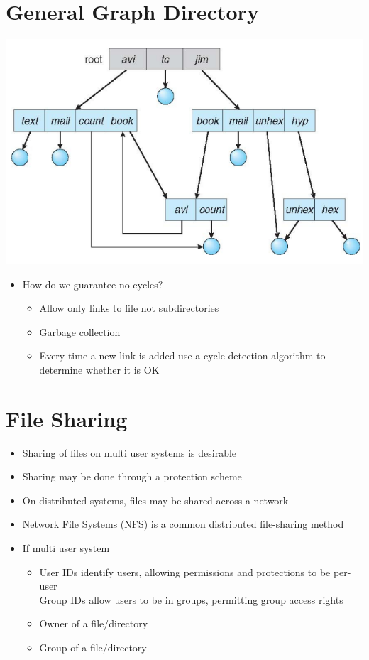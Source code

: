\documentclass{article}[18pt]
\begin{document}
\section{General Graph Directory}
\begin{center}
	\includegraphics[scale=0.7]{General}
\end{center}
\begin{itemize}
	\item How do we guarantee no cycles?
	\begin{itemize}
		\item Allow only links to file not subdirectories
		\item Garbage collection
		\item Every time a new link is added use a cycle detection algorithm to determine whether it is OK
	\end{itemize}
\end{itemize}
\section{File Sharing}
\begin{itemize}
	\item Sharing of files on multi user systems is desirable
	\item Sharing may be done through a protection scheme
	\item On distributed systems, files may be shared across a network
	\item Network File Systems (NFS) is a common distributed file-sharing method
	\item If multi user system
	\begin{itemize}
		\item User IDs identify users, allowing permissions and protections to be per-user\\
		Group IDs allow users to be in groups, permitting group access rights
		\item Owner of a file/directory
		\item Group of a file/directory
	\end{itemize}
\end{itemize}
\end{document}
